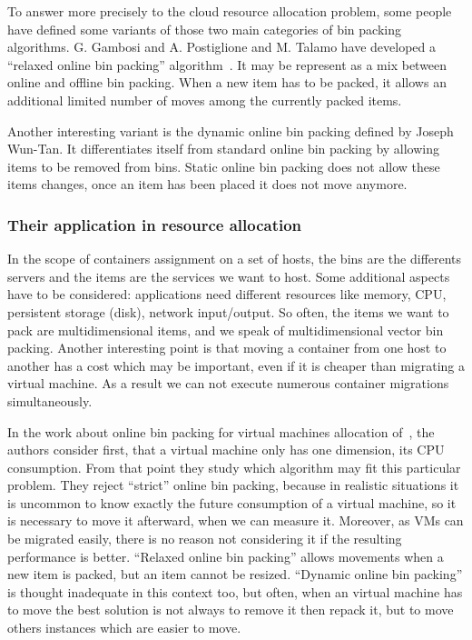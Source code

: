 To answer more precisely to the cloud resource allocation problem, some people
have defined some variants of those two main categories of bin packing
algorithms. G. Gambosi and A. Postiglione and M. Talamo have developed a
“relaxed online bin packing” algorithm~\cite*{mathsRelaxedonlinebp}. It may be
represent as a mix between online and offline bin packing. When a new item has
to be packed, it allows an additional limited number of moves among the
currently packed items.

Another interesting variant is the dynamic online bin packing defined by Joseph
Wun-Tan.  It differentiates itself from standard online bin packing by allowing
items to be removed from bins. Static online bin packing does not allow these
items changes, once an item has been placed it does not move anymore.

\subsubsection{Their application in resource allocation}

In the scope of containers assignment on a set of hosts, the bins are the
differents servers and the items are the services we want to host. Some
additional aspects have to be considered: applications need different
resources like memory, CPU, persistent storage (disk), network input/output. So
often, the items we want to pack are multidimensional items, and we speak of
multidimensional vector bin packing. Another interesting point is that moving a
container from one host to another has a cost which may be important, even if it
is cheaper than migrating a virtual machine. As a result we can not execute
numerous container migrations simultaneously.

In the work about online bin packing for virtual machines allocation
of~\cite*{reassignmentVisbp}, the authors consider first, that a virtual
machine only has one dimension, its CPU consumption. From that point they study
which algorithm may fit this particular problem. They reject “strict” online
bin packing, because in realistic situations it is uncommon to know exactly
the future consumption of a virtual machine, so it is necessary to move it
afterward, when we can measure it. Moreover, as VMs can be migrated easily,
there is no reason not considering it if the resulting performance is better.
“Relaxed online bin packing” allows movements when a new item is packed, but
an item cannot be resized. “Dynamic online bin packing” is thought inadequate
in this context too, but often, when an virtual machine has to move the best
solution is not always to remove it then repack it, but to move others instances
which are easier to move.

